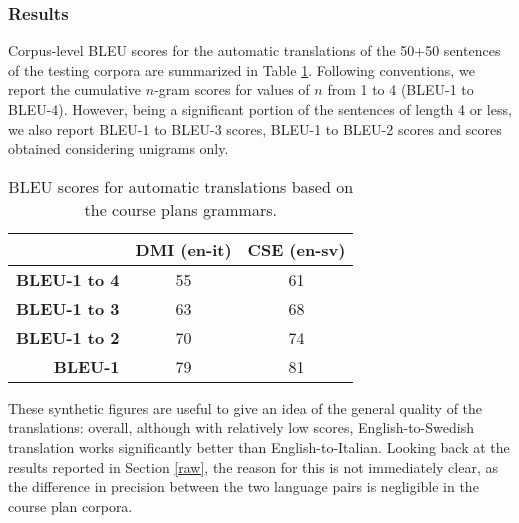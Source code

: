 \documentclass[11pt]{article}
\begin{document}
\subsubsection{Results} 
Corpus-level BLEU scores for the automatic translations of the 50+50 sentences of the testing corpora are summarized in Table \ref{tableu}. 
Following conventions, we report the cumulative $n$-gram scores for values of $n$ from 1 to 4 (BLEU-1 to BLEU-4). 
However, being a significant portion of the sentences of length 4 or less, we also report BLEU-1 to BLEU-3 scores, BLEU-1 to BLEU-2 scores and scores obtained considering unigrams only. 

\begin{table}[h]
  \centering
  \small
  \begin{tabular}{r|cc}
  \textbf{}            & \textbf{DMI (en-it)} & \textbf{CSE (en-sv)} \\ \hline
  \textbf{BLEU-1 to 4} & 55         & 61         \\ 
  \textbf{BLEU-1 to 3} & 63         & 68         \\ 
  \textbf{BLEU-1 to 2} & 70         & 74          \\
  \textbf{BLEU-1}      & 79         & 81         \\ 
  \end{tabular}
  \caption[BLEU scores for automatic translations based on the course plans grammars]{BLEU scores for automatic translations based on the course plans grammars.}
  \label{tableu}
\end{table}

These synthetic figures are useful to give an idea of the general quality of the translations: overall, although with relatively low scores, English-to-Swedish translation works significantly better than English-to-Italian. 
Looking back at the results reported in Section \ref{raw}, the reason for this is not immediately clear, as the difference in precision between the two language pairs is negligible in the course plan corpora.
\end{document}
